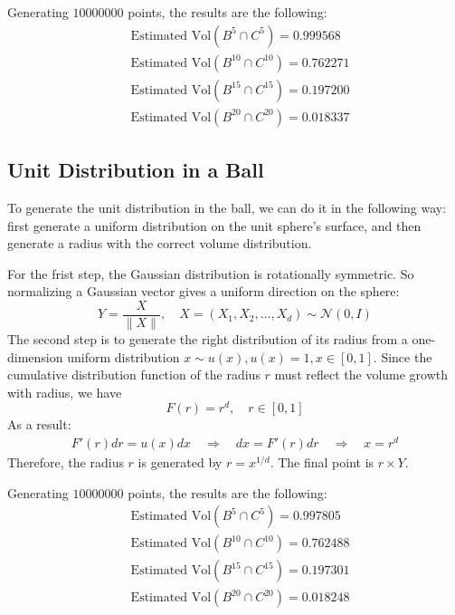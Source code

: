 \documentclass[12pt]{article}
\newcommand{\0}{\boldsymbol{0}}
\begin{document}
Generating $10000000$ points, the results are the following:
\begin{align*}
    & \text{Estimated Vol}(B^5 \cap  C^5) = 0.999568  \\
    & \text{Estimated Vol}(B^{10} \cap C^{10}) = 0.762271  \\
    & \text{Estimated Vol}(B^{15} \cap C^{15}) = 0.197200  \\
    & \text{Estimated Vol}(B^{20} \cap C^{20}) = 0.018337
\end{align*}

\subsection{Unit Distribution in a Ball}

To generate the unit distribution in the ball, we can do it in the following way: first generate a uniform distribution on the unit sphere’s surface, and then generate a radius with the correct volume distribution.

For the frist step, the Gaussian distribution is rotationally symmetric. So normalizing a Gaussian vector gives a uniform direction on the sphere:
\[
    Y=\frac{X}{\|X\|}, \quad X=\left(X_1, X_2, \ldots, X_d\right) \sim \mathcal{N}(0, I)
\]
The second step is to generate the right distribution of its radius from a one-dimension uniform distribution $x\sim u(x), u(x) =1, x\in[0,1]$. Since the cumulative distribution function of the radius $r$ must reflect the volume growth with radius, we have
\[
    F(r) = r^d, \quad r\in[0,1]
\]
As a result:
\begin{align*}
    F'(r) dr = u(x)dx \quad \Rightarrow \quad dx = F'(r)dr \quad \Rightarrow \quad x = r^d
\end{align*}
Therefore, the radius $r$ is generated by $r = x^{1/d}$. The final point is $r\times Y$.

Generating $10000000$ points, the results are the following:
\begin{align*}
    & \text{Estimated Vol}(B^{5} \cap C^5) = 0.997805  \\
    & \text{Estimated Vol}(B^{10} \cap C^{10}) = 0.762488  \\
    & \text{Estimated Vol}(B^{15} \cap C^{15}) = 0.197301  \\
    & \text{Estimated Vol}(B^{20} \cap C^{20}) = 0.018248
\end{align*}
\end{document}
